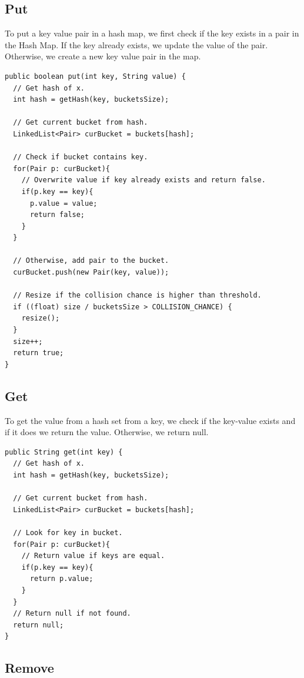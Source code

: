 \documentclass[11pt,oneside]{book}
\begin{document}
\subsection{Put}

To put a key value pair in a hash map, we first check if the key exists in a pair in the Hash Map. If the key already exists, we update the value of the pair. Otherwise, we create a new key value pair in the map.

\begin{lstlisting}
public boolean put(int key, String value) {
  // Get hash of x.
  int hash = getHash(key, bucketsSize);

  // Get current bucket from hash.
  LinkedList<Pair> curBucket = buckets[hash];
  
  // Check if bucket contains key.
  for(Pair p: curBucket){
    // Overwrite value if key already exists and return false.
    if(p.key == key){
      p.value = value;
      return false;
    }
  }
  
  // Otherwise, add pair to the bucket.
  curBucket.push(new Pair(key, value));
  
  // Resize if the collision chance is higher than threshold.
  if ((float) size / bucketsSize > COLLISION_CHANCE) {
    resize();
  }
  size++;
  return true;
}
\end{lstlisting}

\subsection{Get}

To get the value from a hash set from a key, we check if the key-value exists and if it does we return the value. Otherwise, we return null.

\begin{lstlisting}
public String get(int key) {
  // Get hash of x.
  int hash = getHash(key, bucketsSize);
  
  // Get current bucket from hash.
  LinkedList<Pair> curBucket = buckets[hash];
  
  // Look for key in bucket.
  for(Pair p: curBucket){
    // Return value if keys are equal.
    if(p.key == key){
      return p.value;
    }
  }
  // Return null if not found.
  return null;
}
\end{lstlisting}

\subsection{Remove}
\end{document}
